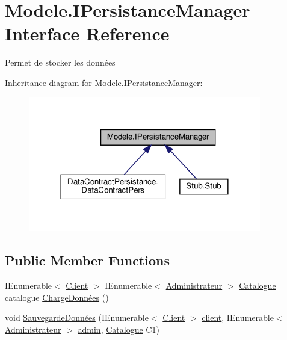\hypertarget{interfaceModele_1_1IPersistanceManager}{}\section{Modele.\+I\+Persistance\+Manager Interface Reference}
\label{interfaceModele_1_1IPersistanceManager}


Permet de stocker les données  




Inheritance diagram for Modele.\+I\+Persistance\+Manager\+:
\nopagebreak
\begin{figure}[H]
\begin{center}
\leavevmode
\includegraphics[width=288pt]{interfaceModele_1_1IPersistanceManager__inherit__graph}
\end{center}
\end{figure}
\subsection*{Public Member Functions}
\begin{DoxyCompactItemize}
\item 
I\+Enumerable$<$ \hyperlink{classModele_1_1Client}{Client} $>$ I\+Enumerable$<$ \hyperlink{classModele_1_1Administrateur}{Administrateur} $>$ \hyperlink{classModele_1_1Catalogue}{Catalogue} catalogue \hyperlink{interfaceModele_1_1IPersistanceManager_af5ae97787e17b1c24fe878ed3d381873}{Charge\+Données} ()
\item 
void \hyperlink{interfaceModele_1_1IPersistanceManager_a1b1fcf75cf99ef247ad7f83b1e816ea4}{Sauvegarde\+Données} (I\+Enumerable$<$ \hyperlink{classModele_1_1Client}{Client} $>$ \hyperlink{interfaceModele_1_1IPersistanceManager_a0f7ffabee613173cb4de6362f9d946b0}{client}, I\+Enumerable$<$ \hyperlink{classModele_1_1Administrateur}{Administrateur} $>$ \hyperlink{interfaceModele_1_1IPersistanceManager_a4613622305c67836114ec254f6a21337}{admin}, \hyperlink{classModele_1_1Catalogue}{Catalogue} C1)
\end{DoxyCompactItemize}
